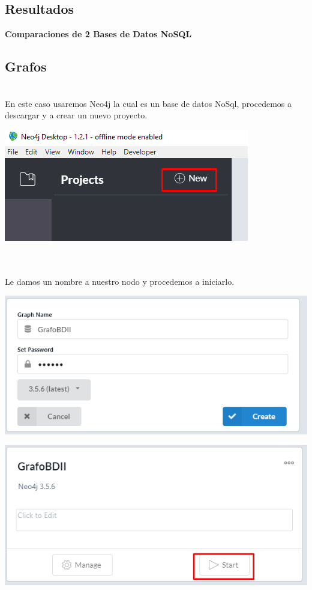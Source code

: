 \documentclass[twoside,onecolumn]{article}
\begin{document}
\begin{flushright}
\begin{itemize}
\section{Resultados}
\textbf{Comparaciones de 2 Bases de Datos NoSQL}\\
\subsection{Grafos}


\textbf{}\\En este caso usaremos Neo4j la cual es un base de datos NoSql, procedemos a descargar y a crear un nuevo proyecto.
\begin{center}
\includegraphics[scale=0.7]{Imagenes/neo4j}
\end{center}	
\textbf{}\\
\textbf{}\\Le damos un nombre a nuestro nodo y procedemos a iniciarlo.
\begin{center}
\includegraphics[scale=0.7]{Imagenes/neo4j2}
\begin{center}
\includegraphics[scale=0.7]{Imagenes/neo4j3}

\end{center}
\end{center}
\end{itemize}
\end{flushright}
\end{document}
